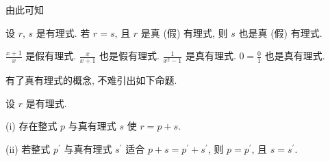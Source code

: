 由此可知
\begin{proposition}
    设 $r$, $s$ 是有理式. 若 $r = s$, 且 $r$ 是真 (假) 有理式, 则 $s$ 也是真 (假) 有理式.
\end{proposition}

\begin{example}
    $\frac{x+1}{x}$ 是假有理式. $\frac{x}{x+1}$ 也是假有理式. $\frac{1}{x^2 - 1}$ 是真有理式. $0 = \frac{0}{1}$ 也是真有理式.
\end{example}

有了真有理式的概念, 不难引出如下命题.

\begin{proposition}
    设 $r$ 是有理式.

    (i) 存在整式 $p$ 与真有理式 $s$ 使 $r = p + s$.

    (ii) 若整式 $p^{\prime}$ 与真有理式 $s^{\prime}$ 适合 $p + s = p^{\prime} + s^{\prime}$, 则 $p = p^{\prime}$, 且 $s = s^{\prime}$.
\end{proposition}

